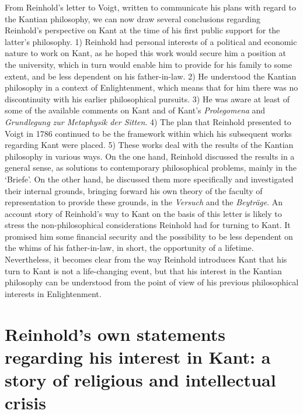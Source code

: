 From Reinhold's letter to Voigt, written to communicate his plans with regard to the Kantian philosophy, we can now draw several conclusions regarding Reinhold's perspective on Kant at the time of his first public support for the latter's philosophy. 1) Reinhold had personal interests of a political and economic nature to work on Kant, as he hoped this work would secure him a position at the university, which in turn would enable him to provide for his family to some extent, and be less dependent on his father{-}in{-}law. 2) He understood the Kantian philosophy in a context of Enlightenment, which means that for him there was no discontinuity with his earlier philosophical pursuits. 3) He was aware at least of some of the available comments on Kant and of Kant's \textit{Prolegomena }and \textit{Grundlegung zur Metaphysik der Sitten}. 4) The plan that Reinhold presented to Voigt in 1786 continued to be the framework within which his subsequent works regarding Kant were placed. 5) These works deal with the results of the Kantian philosophy in various ways. On the one hand, Reinhold discussed the results in a general sense, as solutions to contemporary philosophical problems, mainly in the `Briefe'. On the other hand, he discussed them more specifically and investigated their internal grounds, bringing forward his own theory of the faculty of representation to provide these grounds, in the \textit{Versuch }and the \textit{Beytr\"{a}ge}. An account story of Reinhold's way to Kant on the basis of this letter is likely to stress the non{-}philosophical considerations Reinhold had for turning to Kant. It promised him some financial security and the possibility to be less dependent on the whims of his father{-}in{-}law, in short, the opportunity of a lifetime. Nevertheless, it becomes clear from the way Reinhold introduces Kant that his turn to Kant is not a life{-}changing event, but that his interest in the Kantian philosophy can be understood from the point of view of his previous philosophical interests in Enlightenment. 


\section{Reinhold's own statements regarding his interest in Kant: a story of religious and intellectual crisis}


